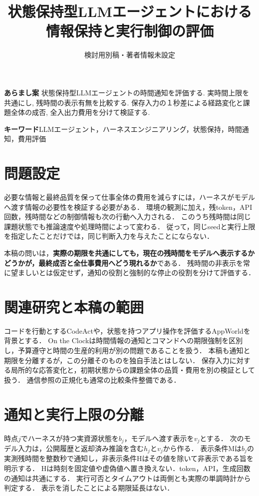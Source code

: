 \documentclass[uplatex,a4paper,twocolumn,10pt]{jsarticle}
\title{状態保持型LLMエージェントにおける\newline 情報保持と実行制御の評価}
\author{検討用別稿・著者情報未設定}
\date{}
\begin{document}
\raggedbottom
\maketitle
\noindent\textbf{あらまし案}\quad
状態保持型LLMエージェントの時間通知を評価する. 実時間上限を共通にし, 残時間の表示有無を比較する. 保存入力の１秒差による経路変化と課題全体の成否, 全入出力費用を分けて検証する.

\noindent\textbf{キーワード}\quad LLMエージェント，ハーネスエンジニアリング，状態保持，時間通知，費用評価

\section{問題設定}
必要な情報と最終品質を保って仕事全体の費用を減らすには，ハーネスがモデルへ渡す情報の必要性を検証する必要がある．
環境の観測に加え，残token，API回数，残時間などの制御情報も次の行動へ入力される．
このうち残時間は同じ課題状態でも推論速度や処理時間によって変わる．
従って，同じseedと実行上限を指定したことだけでは，同じ判断入力を与えたことにならない．

本稿の問いは，\textbf{実際の期限を共通にしても，現在の残時間をモデルへ表示するかどうかが，最終成否と全仕事費用へどう現れるか}である．
残時間の非表示を常に望ましいとは仮定せず，通知の役割と強制的な停止の役割を分けて評価する．

\section{関連研究と本稿の範囲}
コードを行動とするCodeAct\cite{codeact}や，状態を持つアプリ操作を評価するAppWorld\cite{appworld}を背景とする．
On the Clock\cite{clock}は時間情報の通知とコマンドへの期限強制を区別し，予算遵守と時間の生産的利用が別の問題であることを扱う．
本稿も通知と期限を分離するが，この分離そのものを独自手法とはしない．
保存入力に対する局所的な応答変化と，初期状態からの課題全体の品質・費用を別の検証として扱う．
通信参照の正規化も通常の比較条件整備である．

\section{通知と実行上限の分離}
時点$j$でハーネスが持つ実資源状態を$b_j$，モデルへ渡す表示を$v_j$とする．
次のモデル入力は，公開履歴と返却済み推論を含む$h_j$と$v_j$から作る．
表示条件Mは$b_j$の実測残時間を整数秒で通知し，非表示条件Hはその値を除いて非表示である旨を明示する．
Hは時刻を固定値や虚偽値へ置き換えない．token，API，生成回数の通知は共通にする．
実行可否とタイムアウトは両側とも実際の単調時計から判定する．
表示を消したことによる期限延長はない．
\end{document}
